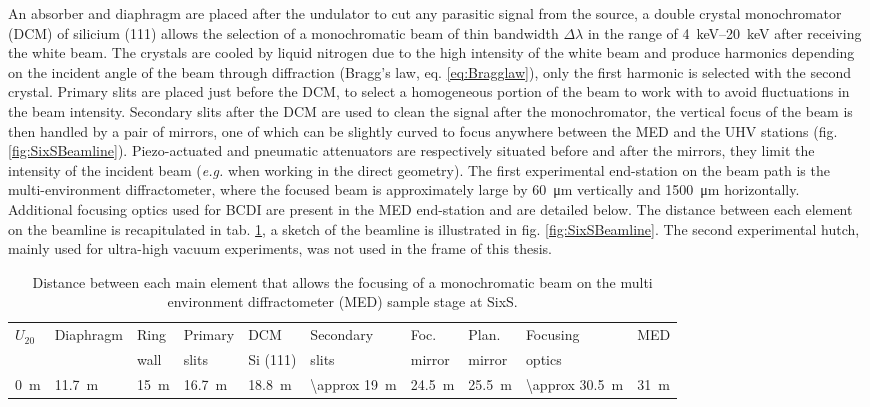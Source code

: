 An absorber and diaphragm are placed after the undulator to cut any parasitic signal from the source, a double crystal monochromator (DCM) of silicium (111) allows the selection of a monochromatic beam of thin bandwidth $\Delta \lambda$ in the range of \qtyrange{4}{20}{\keV} after receiving the white beam.
The crystals are cooled by liquid nitrogen due to the high intensity of the white beam and produce harmonics depending on the incident angle of the beam through diffraction (Bragg's law, eq. \ref{eq:Bragglaw}), only the first harmonic is selected with the second crystal.
Primary slits are placed just before the DCM, to select a homogeneous portion of the beam to work with to avoid fluctuations in the beam intensity.
Secondary slits after the DCM are used to clean the signal after the monochromator, the vertical focus of the beam is then handled by a pair of mirrors, one of which can be slightly curved to focus anywhere between the MED and the UHV stations (fig. \ref{fig:SixSBeamline}).
Piezo-actuated and pneumatic attenuators are respectively situated before and after the mirrors, they limit the intensity of the incident beam (\textit{e.g.} when working in the direct geometry).
The first experimental end-station on the beam path is the multi-environment diffractometer, where the focused beam is approximately large by \qty{60}{\um} vertically and \qty{1500}{\um} horizontally.
Additional focusing optics used for BCDI are present in the MED end-station and are detailed below.
The distance between each element on the beamline is recapitulated in tab. \ref{tab:DistanceSixS}, a sketch of the beamline is illustrated in fig. \ref{fig:SixSBeamline}.
The second experimental hutch, mainly used for ultra-high vacuum experiments, was not used in the frame of this thesis.

\begin{table}[!htb]
	\centering
    \small{
	\begin{tabular}{@{}llllllllll@{}}
	\toprule
	$U_{20}$ & Diaphragm & Ring    & Primary     & DCM         & Secondary       & Foc.      & Plan.     & Focusing &  MED \\
	         &           & wall    & slits       & Si (111)    & slits           & mirror    & mirror    & optics        &  \\
 	\midrule
 	\qty{0}{\m}&\qty{11.7}{\m}&\qty{15}{\m}&\qty{16.7}{\m}&\qty{18.8}{\m}&\qty{\approx 19}{\m}&\qty{24.5}{\m}&\qty{25.5}{\m}&\qty{\approx 30.5}{\m}&\qty{31}{\m}
	\end{tabular}
    }
	\caption{
		Distance between each main element that allows the focusing of a monochromatic beam on the multi environment diffractometer (MED) sample stage at SixS.
	}
    \label{tab:DistanceSixS}
\end{table}

